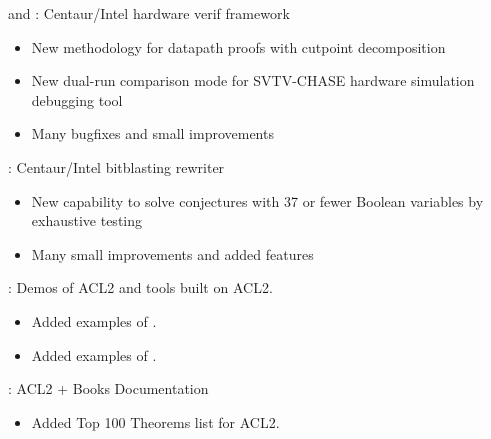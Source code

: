 \begin{frame}

\implibtitle

 and :
Centaur/Intel hardware verif framework
\begin{itemize}
\item New methodology for datapath proofs with cutpoint decomposition
\item New dual-run comparison mode for SVTV-CHASE hardware simulation debugging tool
\item Many bugfixes and small improvements
\end{itemize}

:
Centaur/Intel bitblasting rewriter
\begin{itemize}
\item New capability to solve conjectures with 37 or fewer Boolean variables by exhaustive testing
\item Many small improvements and added features
\end{itemize}

\end{frame}


\begin{frame}

\implibtitle

:
Demos of ACL2 and tools built on ACL2.
\begin{itemize}
\item Added examples of .
\item Added examples of .
\end{itemize}
\end{frame}


\begin{frame}

\implibtitle

:
ACL2 + Books Documentation
\begin{itemize}
\item Added Top 100 Theorems list for ACL2.
\end{itemize}
\end{frame}


